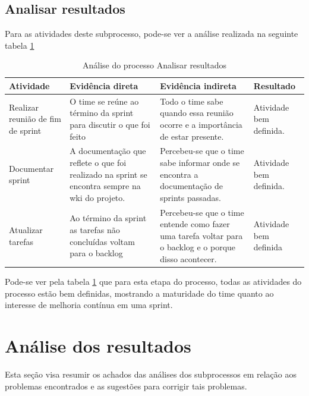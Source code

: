 \documentclass[a4paper, 11pt]{article}
\begin{document}
\subsection*{Analisar resultados}

Para as atividades deste subprocesso, pode-se ver a análise realizada na
seguinte tabela \ref{tab:analisar}

\begin{table}[]
\centering
\caption{Análise do processo Analisar resultados}
\label{tab:analisar}
\begin{tabularx}{\textwidth}{|X|X|X|X|}
\hline
Atividade & Evidência direta & Evidência indireta & Resultado \\ \hline
Realizar reunião de fim de sprint & O time se reúne ao término da sprint para discutir o que foi feito & Todo o time sabe quando essa reunião ocorre e a importância de estar presente. & Atividade bem definida. \\ \hline
Documentar sprint & A documentação que reflete o que foi realizado na sprint se encontra sempre na wki do projeto. & Percebeu-se que o time sabe informar onde se encontra a documentação de sprints passadas. & Atividade bem definida. \\ \hline
Atualizar tarefas & Ao término da sprint as tarefas não concluídas voltam para o backlog & Percebeu-se que o time entende como fazer uma tarefa voltar para o backlog e o porque disso acontecer. & Atividade bem definida \\ \hline
\end{tabularx}
\end{table}

Pode-se ver pela tabela \ref{tab:analisar} que para esta etapa do processo,
todas as atividades do processo estão bem definidas, mostrando a maturidade do
time quanto ao interesse de melhoria contínua em uma sprint.

\section*{Análise dos resultados}

Esta seção visa resumir os achados das análises dos subprocessos em relação aos
problemas encontrados e as sugestões para corrigir tais problemas.
\end{document}
